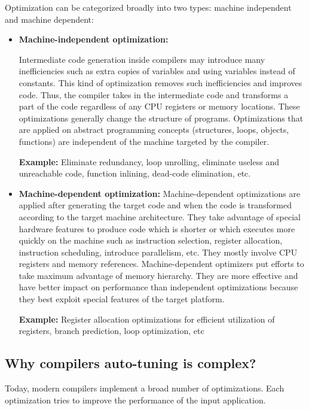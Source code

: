 Optimization can be categorized broadly into two types: machine independent and machine dependent: 
\begin{itemize}
	
	\item \textbf{Machine-independent optimization:}
	
	Intermediate code generation  inside compilers may introduce many inefficiencies such as extra copies of variables and using variables instead of
	constants.
	This kind of optimization removes such inefficiencies and improves code. Thus, the compiler takes in the intermediate code and transforms a part of the code regardless of any CPU registers or memory locations. These optimizations generally change the structure of programs.
	Optimizations that are applied on abstract programming concepts (structures, loops, objects, functions) are independent of the machine targeted by the compiler.
	
	\textbf{Example:} Eliminate redundancy, loop unrolling, eliminate useless and unreachable code, function inlining, dead-code elimination, etc.
	
	\item \textbf{Machine-dependent optimization:} 
	Machine-dependent optimizations are applied after generating the target code and when the code is transformed according to the target machine architecture. They take advantage of special hardware features to produce code which is shorter or which executes more quickly on the machine such as instruction selection, register allocation, instruction scheduling, introduce parallelism, etc.
	They mostly involve CPU registers and memory references. Machine-dependent optimizers put efforts to take maximum advantage of memory hierarchy. They are more effective and have better impact on performance than independent optimizations because they best exploit special features of the target platform.
	
	\textbf{Example:} Register allocation optimizations for efficient utilization of registers, branch prediction, loop optimization, etc
 
 
\end{itemize}
 

 
 
 

\subsection{Why compilers auto-tuning is complex?}
\label{sec:Why compilers auto-tuning is complex?}
Today, modern compilers implement a broad number of optimizations. Each optimization tries to improve the performance of the input application.

